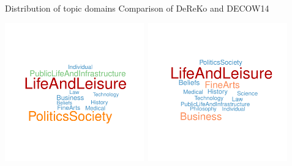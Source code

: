 \documentclass{beamer}
\begin{document}
\begin{frame}
  {Distribution of topic domains}
  Comparison of DeReKo and DECOW14\\[1cm]
  \begin{center}
    \includegraphics[width=0.45\textwidth]{graphics/dereko-cowcat}~\includegraphics[width=0.45\textwidth]{graphics/cow-cowcat}
  \end{center}
\end{frame}
\end{document}
